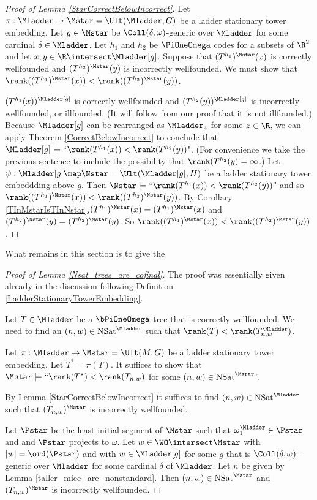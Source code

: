 \documentclass[oneside,12pt]{amsart}
\DeclareMathOperator{\NSat}{NSat}
\begin{document}
\begin{proof}[Proof of Lemma \ref{StarCorrectBelowIncorrect}]
Let $\pi:\Mladder\to\Mstar=\Ult(\Mladder,G)$ be a ladder stationary tower embedding.
Let $g\in\Mstar$ be $\Coll(\delta,\omega)$-generic over $\Mladder$ for some cardinal $\delta\in\Mladder$.
Let $h_1$ and $h_2$ be $\PiOneOmega$ codes for a subsets
of $\R^2$ and let $x,y\in\R\intersect \Mladder[g]$. Suppose that
$(T^{h_1})^{\Mstar}(x)$ is correctly wellfounded and $(T^{h_2})^{\Mstar}(y)$ is incorrectly wellfounded.
We must show that $\rank((T^{h_1})^{\Mstar}(x))<\rank((T^{h_2})^{\Mstar}(y))$.


$(T^{h_1}(x))^{\Mladder[g]}$
is correctly wellfounded and
$(T^{h_2}(y))^{\Mladder[g]}$
is incorrectly wellfounded, or illfounded. (It will follow from our proof that it is not illfounded.)
Because $\Mladder[g]$ can be rearranged as $\Mladder_z$ for some $z\in\R$,
we can apply Theorem \ref{CorrectBelowIncorrect} to conclude that
$\Mladder[g]\models \text{``}\rank(T^{h_1}(x)) < \rank(T^{h_2}(y))$". (For convenience we take the previous
sentence to include the possibility that $\rank(T^{h_2}(y)=\infty$.)
Let $\psi:\Mladder[g]\map\Nstar=\Ult(\Mladder[g],H)$ be a ladder stationary tower embeddding
above $g$. Then $\Nstar\models \text{``}\rank(T^{h_1}(x)) < \rank(T^{h_2}(y))$" and
so $\rank((T^{h_1})^{\Nstar}(x)) < \rank((T^{h_2})^{\Nstar}(y))$.
By Corollary \ref{TInMstarIsTInNstar},$(T^{h_1})^{\Nstar}(x)=(T^{h_1})^{\Mstar}(x)$ and
$(T^{h_2})^{\Nstar}(y)=(T^{h_2})^{\Mstar}(y)$.
So $\rank((T^{h_1})^{\Mstar}(x))<\rank((T^{h_2})^{\Mstar}(y))$.
\end{proof}

What remains in this section is to give the
\begin{proof}[Proof of Lemma \ref{Nsat_trees_are_cofinal}]
The proof was essentially given already in the discussion following Definition
\ref{LadderStationaryTowerEmbedding}.

Let $T\in\Mladder$ be a $\bPiOneOmega$-tree that is correctly wellfounded.
We need to find an $(n,w)\in \NSat^{\Mladder}$ such that $\rank(T) < \rank(T^{\Mladder}_{n,w})$.

Let $\pi:\Mladder\to\Mstar=\Ult(M,G)$ be a ladder stationary tower embedding.
Let $T^* = \pi(T)$. It suffices to show that
$\Mstar\models\text{``}\rank(T^*) < \rank(T_{n,w})$ for some $(n,w)\in \NSat^{\Mstar}$''.

By Lemma \ref{StarCorrectBelowIncorrect} it suffices to find
$(n,w)\in \NSat^{\Mladder}$ such that $(T_{n,w})^{\Mstar}$ is incorrectly wellfounded.


Let $\Pstar$ be the least initial segment of $\Mstar$ such that
$\omega_1^{\Mladder}\in\Pstar$ and
and $\Pstar$ projects to $\omega$.
Let $w\in\WO\intersect\Mstar$ with $|w|=\ord(\Pstar)$ and with $w\in \Mladder[g]$ for
some $g$ that is $\Coll(\delta,\omega)$-generic over $\Mladder$ for some cardinal $\delta$ of $\Mladder$.
Let
$n$ be given by Lemma \ref{taller_mice_are_nonstandard}. Then
$(n,w)\in \NSat^{\Mstar}$ and
$(T_{n,w})^{\Mstar}$ is incorrectly wellfounded.
\end{proof}




\end{document}
